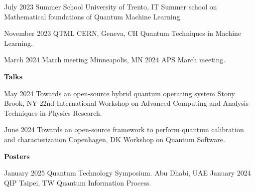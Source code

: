 \documentclass[9pt]{developercv} %
\begin{document}

\begin{entrylist}

    \entry
        {July 2023}
        {Summer School}
        {University of Trento, IT}
        {Summer school on Mathematical foundations of Quantum Machine Learning.}
        {}
         
    \entry
        {November 2023}
        {QTML}
        {CERN, Geneva, CH}
        {Quantum Techniques in Machine Learning.}
        {}


    \entry
        {March 2024}
        {March meeting}
        {Minneapolis, MN}
        {2024 APS March meeting.}
        {}



\end{entrylist}
\textbf{Talks}\\
\begin{entrylist}
    \entry
        {May 2024}
        {Towards an open-source hybrid quantum operating system}
        {Stony Brook, NY}
        {22nd International Workshop on Advanced Computing and Analysis Techniques in Physics Research.}
        {}

    \entry
        {June 2024}
        {Towards an open-source framework to perform quantum calibration and characterization}
        {Copenhagen, DK}
        {Workshop on Quantum Software.}
        {}
\end{entrylist}

\textbf{Posters}\\
\begin{entrylist}
    \entry
        {January 2025}
        {Quantum Technology Symposium.}
        {Abu Dhabi, UAE}
        {}
        {}
    \entry
        {January 2024}
        {QIP}
        {Taipei, TW}
        {Quantum Information Process.}
        {}
\end{entrylist}



\begin{refsection}[journals]
    \nocite{*}
    \printbibliography[heading=journals]
\end{refsection}

\begin{refsection}[proceedings]
    \nocite{*}
    \printbibliography[heading=proceedings]
\end{refsection}




\end{document}
